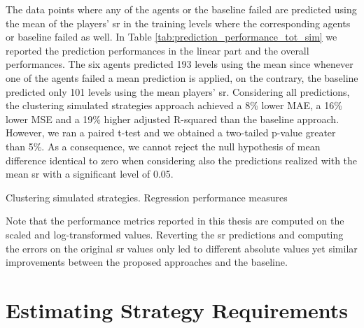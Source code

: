 The data points where any of the agents or the baseline failed are predicted using the mean of the players' \acs{sr} in the training levels where the corresponding agents or baseline failed as well.
In Table \ref{tab:prediction_performance_tot_sim} we reported the prediction performances in the linear part and the overall performances. The six agents predicted 193 levels using the mean since whenever one of the agents failed a mean prediction is applied, on the contrary, the baseline predicted only 101 levels using the mean players' \acs{sr}. Considering all predictions, the clustering simulated strategies approach achieved a 8\% lower MAE, a 16\% lower MSE and a 19\% higher adjusted R-squared than the baseline approach. However, we ran a paired t-test and we obtained a two-tailed p-value greater than 5\%. As a consequence, we cannot reject the null hypothesis of mean difference identical to zero when considering also the predictions realized with the mean \acs{sr} with a significant level of 0.05. 

\begin{table}[h]
    \centering
    \small
    \caption{Clustering simulated strategies. Regression performance measures} 
    
    \label{tab:prediction_performance_tot_sim}
\end{table} 

Note that the performance metrics reported in this thesis are computed on the scaled and log-transformed values. Reverting the \acs{sr} predictions and computing the errors on the original \acs{sr} values only led to different absolute values yet similar improvements between the proposed approaches and the baseline.

\section{Estimating Strategy Requirements}\label{estimate_strategy}

